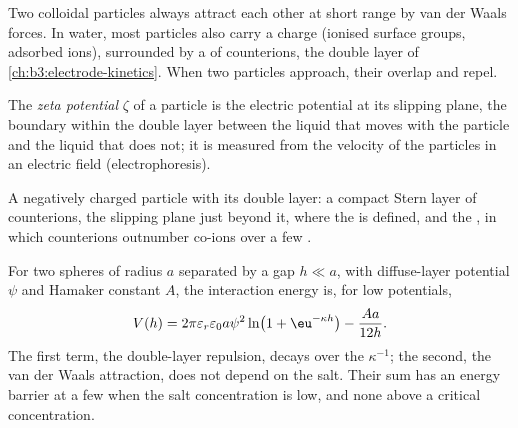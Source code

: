 Two colloidal particles always attract each other at short range by van der
Waals forces. In water, most particles also carry a charge (ionised surface
groups, adsorbed ions), surrounded by a  of counterions, the double
layer of \cref{ch:b3:electrode-kinetics}. When two particles approach, their
 overlap and repel.

\begin{definition}\label{def:b3:colloids:zeta}
The \emph{zeta potential} $\zeta$ of a particle is the electric
potential at its slipping plane, the boundary within the double layer between
the liquid that moves with the particle and the liquid that does not; it is
measured from the velocity of the particles in an electric field
(electrophoresis).
\end{definition}

\begin{omfigure}

{\small A negatively charged particle with its double layer: a compact Stern
layer of counterions, the slipping plane just beyond it, where the  is defined, and the , in which counterions outnumber
co-ions over a few .}
\end{omfigure}

\begin{theorem}\label{thm:b3:colloids:dlvo}
For two spheres of radius $a$ separated by a gap $h \ll a$, with diffuse-layer potential
$\psi$ and Hamaker constant $A$, the interaction energy is, for low potentials,
\[
  V(h) = 2\pi\varepsilon_r\varepsilon_0a\psi^2\ln\bigl(1 + \eu^{-\kappa h}\bigr) - \frac{Aa}{12h} .
\]
The first term, the double-layer repulsion, decays over the  $\kappa^{-1}$;
the second, the van der Waals attraction, does not depend on the salt. Their sum
has an energy barrier at a few  when the salt concentration is
low, and none above a critical concentration.
\end{theorem}

